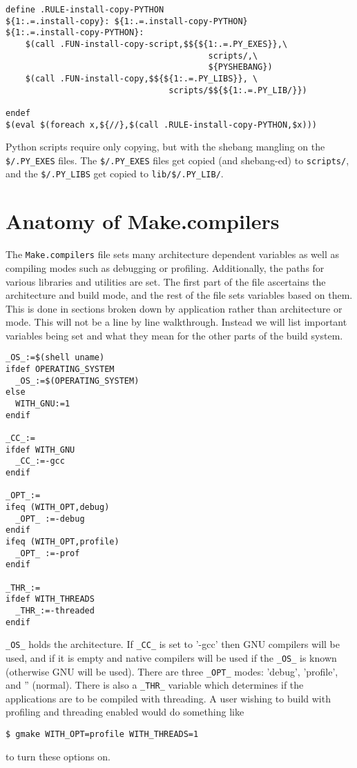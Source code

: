 \documentclass{article}
\begin{document}
\begin{verbatim}
define .RULE-install-copy-PYTHON
${1:.=.install-copy}: ${1:.=.install-copy-PYTHON}
${1:.=.install-copy-PYTHON}:
	$(call .FUN-install-copy-script,$${${1:.=.PY_EXES}},\
                                         scripts/,\
                                         ${PYSHEBANG})
	$(call .FUN-install-copy,$${${1:.=.PY_LIBS}}, \
                                 scripts/$${${1:.=.PY_LIB/}})

endef
$(eval $(foreach x,${//},$(call .RULE-install-copy-PYTHON,$x)))
\end{verbatim}
Python scripts require only copying, but with the shebang mangling
on the \verb+$/.PY_EXES+ files.  The \verb+$/.PY_EXES+ files get
copied (and shebang-ed) to \verb+scripts/+, and the
\verb+$/.PY_LIBS+ get copied to \verb+lib/$/.PY_LIB/+.

\section{Anatomy of Make.compilers}

The \verb+Make.compilers+ file sets many architecture dependent
variables as well as compiling modes such as debugging or profiling.
Additionally, the paths for various libraries and utilities are set.
The first part of the file ascertains the architecture and build mode,
and the rest of the file sets variables based on them.  This is done
in sections broken down by application rather than architecture or
mode.  This will not be a line by line walkthrough.  Instead we will
list important variables being set and what they mean for the other
parts of the build system.

\begin{verbatim}
_OS_:=$(shell uname)
ifdef OPERATING_SYSTEM
  _OS_:=$(OPERATING_SYSTEM)
else
  WITH_GNU:=1
endif

_CC_:=
ifdef WITH_GNU
  _CC_:=-gcc
endif

_OPT_:=
ifeq (WITH_OPT,debug)
  _OPT_ :=-debug
endif
ifeq (WITH_OPT,profile)
  _OPT_ :=-prof
endif

_THR_:=
ifdef WITH_THREADS
  _THR_:=-threaded
endif
\end{verbatim}
\verb+_OS_+ holds the architecture.  If \verb+_CC_+ is set to '-gcc'
then GNU compilers will be used, and if it is empty and native
compilers will be used if the \verb+_OS_+ is known (otherwise GNU
will be used).  There are three \verb+_OPT_+ modes: 'debug', 'profile',
and '' (normal).  There is also a \verb+_THR_+ variable which determines
if the applications are to be compiled with threading.  A user wishing
to build with profiling and threading enabled would do something like
\begin{verbatim}
$ gmake WITH_OPT=profile WITH_THREADS=1
\end{verbatim}
to turn these options on.
\end{document}
